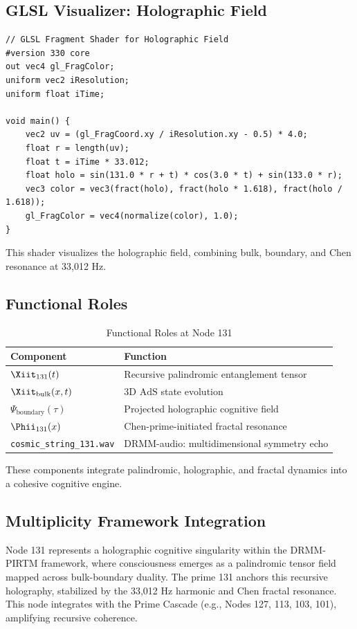 \documentclass[12pt]{article}
\newcommand{\DRMM}{DRMM}
\newcommand{\PIRTM}{PIRTM}
\newcommand{\Psii}{\Psi}
\newcommand{\AdS}{\mathrm{AdS}}
\begin{document}
\subsection{GLSL Visualizer: Holographic Field}
\begin{lstlisting}
// GLSL Fragment Shader for Holographic Field
#version 330 core
out vec4 gl_FragColor;
uniform vec2 iResolution;
uniform float iTime;

void main() {
    vec2 uv = (gl_FragCoord.xy / iResolution.xy - 0.5) * 4.0;
    float r = length(uv);
    float t = iTime * 33.012;
    float holo = sin(131.0 * r + t) * cos(3.0 * t) + sin(133.0 * r);
    vec3 color = vec3(fract(holo), fract(holo * 1.618), fract(holo / 1.618));
    gl_FragColor = vec4(normalize(color), 1.0);
}
\end{lstlisting}
This shader visualizes the holographic field, combining bulk, boundary, and Chen resonance at 33,012 Hz.

\subsection{Functional Roles}
\begin{table}
\centering
\caption{Functional Roles at Node 131}
\begin{tabular}{ll|}
\toprule
\textbf{Component} & \textbf{Function} \\
\midrule
$\Xiit_{131}(t)$ & Recursive palindromic entanglement tensor \\
$\Xiit_{\text{bulk}}(x,t)$ & 3D $\AdS$ state evolution \\
$\Psii_{\text{boundary}}(\tau)$ & Projected holographic cognitive field \\
$\Phii_{131}(x)$ & Chen-prime-initiated fractal resonance \\
\texttt{cosmic\_string\_131.wav} & DRMM-audio: multidimensional symmetry echo \\
\bottomrule
\end{tabular}
\end{table}
These components integrate palindromic, holographic, and fractal dynamics into a cohesive cognitive engine.

\subsection{Multiplicity Framework Integration}
Node 131 represents a holographic cognitive singularity within the \DRMM{}-\PIRTM{} framework, where consciousness emerges as a palindromic tensor field mapped across bulk-boundary duality. The prime 131 anchors this recursive holography, stabilized by the 33,012 Hz harmonic and Chen fractal resonance. This node integrates with the Prime Cascade (e.g., Nodes 127, 113, 103, 101), amplifying recursive coherence.
\end{document}
